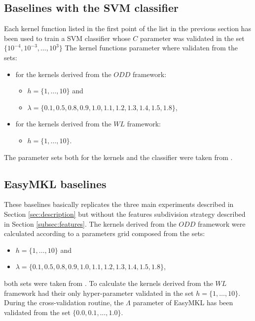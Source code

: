 \subsection{Baselines with the SVM classifier}

Each kernel function listed in the first point of the list in the previous section has 
been used to train a SVM classifier whose $C$ parameter was validated
in the set $\{10^{-4},10^{-3},\dots,10^3\}$
The kernel functions parameter where validaten from the sets:
\begin{itemize}
    \item for the kernels derived from the $ODD$ framework:
    \begin{itemize}
        \item $h=\{1,\dots,10\}$ and 
        \item $\lambda=\{0.1, 0.5, 0.8, 0.9, 1.0, 1.1, 1.2, 1.3, 1.4, 1.5, 1.8\}$,
    \end{itemize}
    \item for the kernels derived from the $WL$ framework:
    \begin{itemize}
        \item $h=\{1,\dots,10\}$.
    \end{itemize}
\end{itemize}
The parameter sets both for the kernels and the classifier were taken from \cite{rtesselli}.

\subsection{EasyMKL baselines}
These baselines basically replicates the three main experiments described in Section
\ref{sec:description} but without the features subdivision strategy described in
Section \ref{subsec:features}.
The kernels derived from the $ODD$ framework were calculated according to a parameters grid
composed from the sets:
\begin{itemize}
    \item $h=\{1,\dots,10\}$ and 
    \item $\lambda=\{0.1, 0.5, 0.8, 0.9, 1.0, 1.1, 1.2, 1.3, 1.4, 1.5, 1.8\}$,
\end{itemize}
both sets were taken from \cite{rtesselli}.
To calculate the kernels derived from the $WL$ framework had their only hyper-parameter validated
in the set $h=\{1,\dots,10\}$.
During the cross-validation routine, the $\Lambda$ parameter of EasyMKL has been
validated from the set $\{0.0, 0.1,\dots,1.0\}$.


